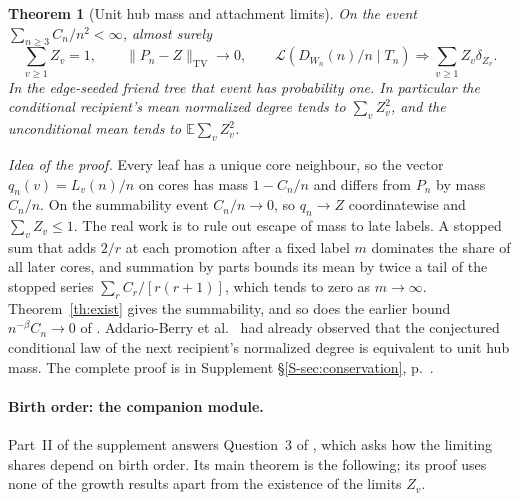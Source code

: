 \documentclass[11pt]{article}
\newtheorem{theorem}{Theorem}
\newcommand{\resulttag}{?}
\newcommand{\tagnext}[1]{\renewcommand{\resulttag}{#1}}
\theoremstyle{remark}
\newcommand{\E}{\mathbb E}
\newcommand{\Sref}[1]{Supplement \S\ref{S-#1}, p.~\pageref{S-#1}}
\begin{document}
\tagnext{MASS}
\begin{theorem}[Unit hub mass and attachment limits]\label{th:hub-mass}
On the event $\sum_{n\ge3} C_n/n^2<\infty$, almost surely
\[
 \sum_{v\ge1} Z_v=1,\qquad
 \|P_n-Z\|_{\mathrm{TV}}\longrightarrow0,\qquad
 \mathcal L(D_{W_n}(n)/n\mid T_n)\Longrightarrow \sum_{v\ge1}Z_v\delta_{Z_v}.
\]
In the edge-seeded friend tree that event has probability one. In particular the conditional recipient's mean normalized degree tends to $\sum_v Z_v^2$, and the unconditional mean tends to $\E\sum_v Z_v^2$.
\end{theorem}
\emph{Idea of the proof.} Every leaf has a unique core neighbour, so the vector $q_n(v)=L_v(n)/n$ on cores has mass $1-C_n/n$ and differs from $P_n$ by mass $C_n/n$. On the summability event $C_n/n\to0$, so $q_n\to Z$ coordinatewise and $\sum_vZ_v\le1$. The real work is to rule out escape of mass to late labels. A stopped sum that adds $2/r$ at each promotion after a fixed label $m$ dominates the share of all later cores, and summation by parts bounds its mean by twice a tail of the stopped series $\sum_rC_r/[r(r+1)]$, which tends to zero as $m\to\infty$. Theorem~\ref{th:exist} gives the summability, and so does the earlier bound $n^{-\beta}C_n\to0$ of \cite[Prop.~6.22]{AB}. Addario-Berry et al.\ \cite[Sec.~3]{AB} had already observed that the conjectured conditional law of the next recipient's normalized degree is equivalent to unit hub mass. The complete proof is in \Sref{sec:conservation}.

\paragraph{Birth order: the companion module.} Part~II of the supplement answers Question~3 of \cite[Sec.~7]{AB}, which asks how the limiting shares depend on birth order. Its main theorem is the following; its proof uses none of the growth results apart from the existence of the limits $Z_v$.
\end{document}
